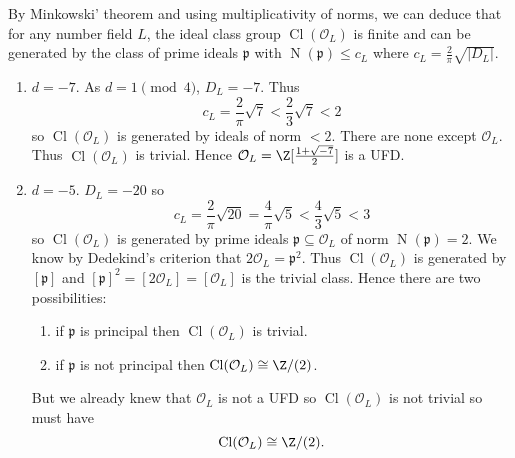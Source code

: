 \documentclass[a4paper]{article}
\renewcommand*{\O}{\mathcal{O}}
\DeclareMathOperator{\n}{N}
\DeclareMathOperator{\Cl}{Cl}%
\begin{document}
By Minkowski' theorem and using multiplicativity of norms, we can deduce that for any number field \(L\), the ideal class group \(\Cl(\O_L)\) is finite and can be generated by the class of prime ideals \(\mathfrak{p}\) with \(\n(\mathfrak{p}) \leq c_L\) where \(c_L = \frac{2}{\pi}\sqrt{|D_L|}\).

\begin{eg}\leavevmode
  \begin{enumerate}
  \item \(d = -7\). As \(d = 1 \pmod 4\), \(D_L = -7\). Thus
    \[
      c_L = \frac{2}{\pi} \sqrt 7 < \frac{2}{3} \sqrt 7 < 2
    \]
    so \(\Cl(\O_L)\) is generated by ideals of norm \(< 2\). There are none except \(\O_L\). Thus \(\Cl(\O_L)\) is trivial. Hence \(\O_L = \Z[\frac{1 + \sqrt{-7}}{2}]\) is a UFD.
  \item \(d = -5\). \(D_L = -20\) so
    \[
      c_L = \frac{2}{\pi}\sqrt{20} = \frac{4}{\pi}\sqrt 5 < \frac{4}{3} \sqrt 5 < 3
    \]
    so \(\Cl(\O_L)\) is generated by prime ideals \(\mathfrak p \subseteq \O_L\) of norm \(\n(\mathfrak p) = 2\). We know by Dedekind's criterion that \(2\O_L = \mathfrak p^2\). Thus \(\Cl(\O_L)\) is generated by \([\mathfrak p]\) and \([\mathfrak p]^2 = [2\O_L] = [\O_L]\) is the trivial class. Hence there are two possibilities:
    \begin{enumerate}
    \item if \(\mathfrak p\) is principal then \(\Cl(\O_L)\) is trivial.
    \item if \(\mathfrak p\) is not principal then \(\Cl(\O_L) \cong \Z/(2)\).
    \end{enumerate}
    But we already knew that \(\O_L\) is not a UFD so \(\Cl(\O_L)\) is not trivial so must have
    \[
      \Cl(\O_L) \cong \Z/(2).
    \]
  \end{enumerate}
\end{eg}
\end{document}
